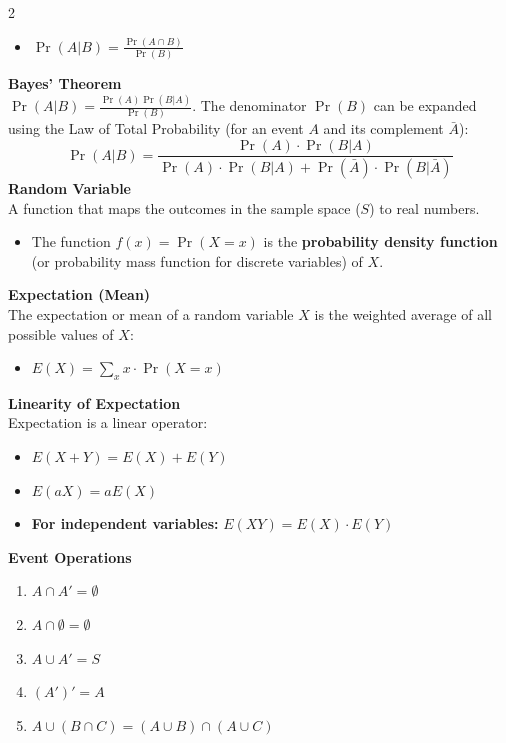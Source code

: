 \documentclass[10pt,landscape]{article}
\begin{document}
\begin{multicols*}{2}
\begin{itemize}
    \item $\Pr(A|B) = \frac{\Pr(A \cap B)}{\Pr(B)}$
\end{itemize}
\vspace{8pt}
\textbf{Bayes' Theorem} \\
$\Pr(A|B) = \frac{\Pr(A) \Pr(B|A)}{\Pr(B)}$.
\vspace{8pt}
The denominator $\Pr(B)$ can be expanded using the Law of Total Probability (for an event $A$ and its complement $\bar{A}$):
\[ \Pr(A|B) = \frac{\Pr(A) \cdot \Pr(B|A)}{\Pr(A) \cdot \Pr(B|A) + \Pr(\bar{A}) \cdot \Pr(B|\bar{A})} \]
\vspace{8pt}
\textbf{Random Variable} \\
A function that maps the outcomes in the sample space ($S$) to real numbers.
\begin{itemize}
    \item The function $f(x) = \Pr(X = x)$ is the \textbf{probability density function} (or probability mass function for discrete variables) of $X$.
\end{itemize}
\vspace{8pt}
\textbf{Expectation (Mean)} \\
The expectation or mean of a random variable $X$ is the weighted average of all possible values of $X$:
\begin{itemize}
    \item $E(X) = \sum_{x} x \cdot \Pr(X = x)$
\end{itemize}
\vspace{8pt}
\textbf{Linearity of Expectation} \\
Expectation is a linear operator:
\begin{itemize}
    \item $E(X + Y) = E(X) + E(Y)$
    \item $E(aX) = a E(X)$
    \item \textbf{For independent variables:} $E(XY) = E(X) \cdot E(Y)$
\end{itemize}
\vspace{8pt}
\textbf{Event Operations}
\begin{enumerate}
    \item $A \cap A' = \emptyset$
    \item $A \cap \emptyset = \emptyset$
    \item $A \cup A' = S$
    \item $(A')' = A$
    \item $A \cup (B \cap C) = (A \cup B) \cap (A \cup C)$

\end{enumerate}
\end{multicols*}
\end{document}
